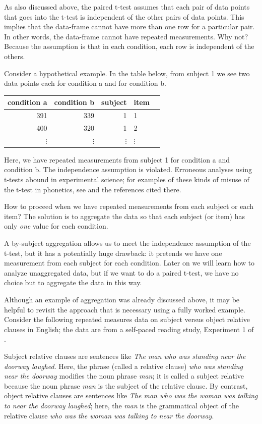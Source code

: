 \documentclass[
  12pt,
]{krantz}
\theoremstyle{definition}
\theoremstyle{definition}
\theoremstyle{definition}
\theoremstyle{definition}
\theoremstyle{remark}
\begin{document}
As also discussed above, the paired t-test assumes that each pair of data points that goes into the t-test is independent of the other pairs of data points. This implies that the data-frame cannot have more than one row for a particular pair. In other words, the data-frame cannot have repeated measurements. Why not? Because the assumption is that in each condition, each row is independent of the others.

Consider a hypothetical example. In the table below, from subject 1 we see two data points each for condition a and for condition b.

\begin{table}[ht]
\centering
\begin{tabular}{rrrll}
\hline
condition a & condition b & subject & item \\ 
\hline
391 & 339 & 1 & 1 \\ 
400 & 320 & 1 & 2 \\ 
$\vdots$ & $\vdots$ & $\vdots$ & $\vdots$\\
\hline
\end{tabular}
\end{table}

Here, we have repeated measurements from subject 1 for condition a and condition b. The independence assumption is violated. Erroneous analyses using t-tests abound in experimental science; for examples of these kinds of misuse of the t-test in phonetics, see \citet{NicenboimRoettgeretal} and the references cited there.

How to proceed when we have repeated measurements from each subject or each item?
The solution is to aggregate the data so that each subject (or item) has only \emph{one} value for each condition.

A by-subject aggregation allows us to meet the independence assumption of the t-test, but it has a potentially huge drawback: it pretends we have one measurement from each subject for each condition.
Later on we will learn how to analyze unaggregated data, but if we want to do a paired t-test, we have no choice but to aggregate the data in this way.

Although an example of aggregation was already discussed above, it may be helpful to revisit the approach that is necessary using a fully worked example. Consider the following repeated measures data on subject versus object relative clauses in English; the data are from a self-paced reading study, Experiment 1 of \citet{grodner}.

Subject relative clauses are sentences like \emph{The man who was standing near the doorway laughed}. Here, the phrase (called a relative clause) \emph{who was standing near the doorway} modifies the noun phrase \emph{man}; it is called a subject relative because the noun phrase \emph{man} is the subject of the relative clause. By contrast, object relative clauses are sentences like \emph{The man who was the woman was talking to near the doorway laughed}; here, the \emph{man} is the grammatical object of the relative clause \emph{who was the woman was talking to near the doorway}.
\end{document}
